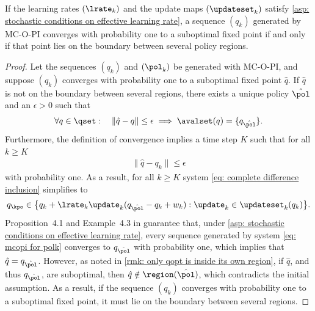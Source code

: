\begin{lemma}
\label{thm: fixed points are on the boundary}
    If the learning rates $(\lrate_k)$ and the update maps $(\updateset_k)$ satisfy \autoref{asp: stochastic conditions on effective learning rate}, 
    a sequence $(q_k)$ generated by MC-O-PI converges with probability one to a suboptimal fixed point 
    if and only if that point lies on the boundary between several policy regions.
\end{lemma}
\begin{proof}
    Let the sequences $(q_k)$ and $(\pol_k)$ be generated with MC-O-PI, 
    and suppose $(q_k)$ converges with probability one to a suboptimal fixed point $\hat{q}$. 
    If $\hat{q}$ is not on the boundary between several regions, there exists a unique policy $\hat{\pol}$ and an $\epsilon > 0$ such that 
    \begin{align*}
        \forall q \in \qset : 
        \quad
        \|\hat{q} - q\| \leq \epsilon
        \implies
        \avalset(q) = \{q_{\hat{\pol}}\} .
    \end{align*}
    Furthermore, the definition of convergence implies a time step $K$ such that for all $k \geq K$
    \begin{align*}
        \|\hat{q} - q_k\| \leq \epsilon
    \end{align*}
    with probability one.
    As a result, for all $k \geq K$ 
    system \eqref{eq: complete difference inclusion} simplifies to
    \begin{align}
        \label{eq: mcopi for polk}
        q_\kpo \in \big\{ q_k + \lrate_k \update_k (q_{\hat{\pol}} - q_k + w_k) : \update_k \in \updateset_k(q_k) \big\} .
    \end{align}
    Proposition~4.1 and Example~4.3 in \citep{Bertsekas1996Neuro-DynamicProgramming}  guarantee that, under \autoref{asp: stochastic conditions on effective learning rate}, every sequence generated by system \eqref{eq: mcopi for polk} converges to $q_{\hat{\pol}}$ with probability one, which implies that $\hat{q} = q_{\hat{\pol}}$.
    However, as noted in \autoref{rmk: only qopt is inside its own region}, if $\hat{q}$, and thus $q_{\hat{\pol}}$, are suboptimal, then $\hat{q} \notin \region(\hat{\pol})$, which contradicts the initial assumption.
    As a result, if the sequence $(q_k)$ converges with probability one to a suboptimal fixed point, it must lie on the boundary between several regions.
\end{proof}

